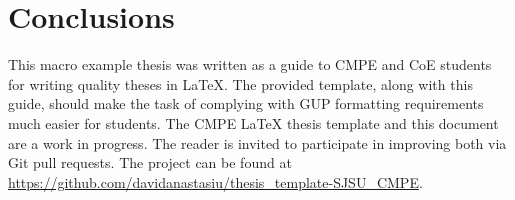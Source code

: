 \section{Conclusions}\label{sec:conclusions}
This macro example thesis was written as a guide to CMPE and CoE students for writing quality theses in LaTeX. The provided template, along with this guide, should make the task of complying with GUP formatting requirements much easier for students. The CMPE LaTeX thesis template and this document are a work in progress. The reader is invited to participate in improving both via Git pull requests. The project can be found at \url{https://github.com/davidanastasiu/thesis_template-SJSU_CMPE}.

